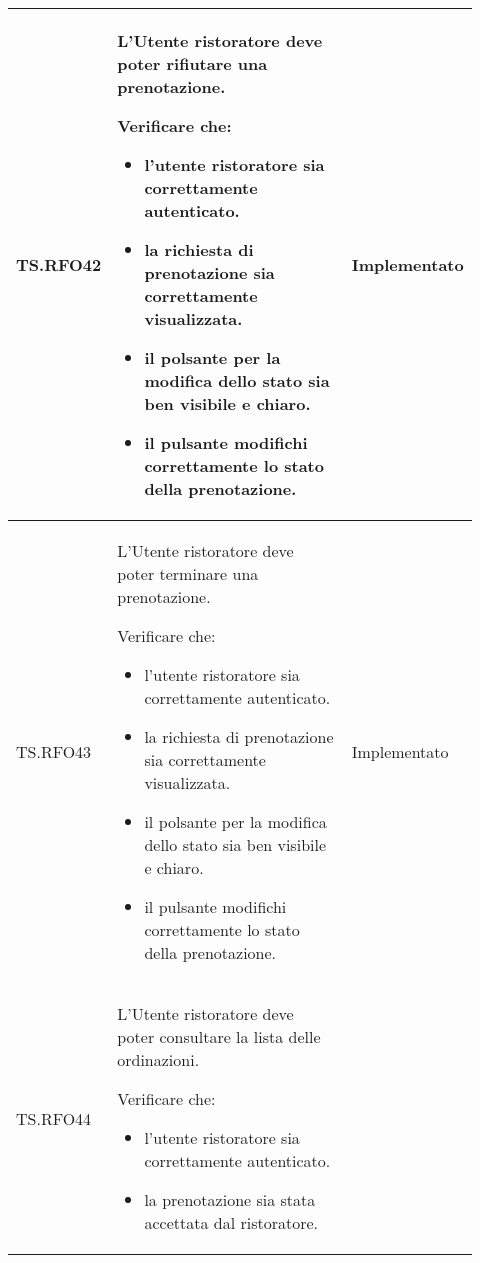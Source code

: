 \begin{longtable}{|p{0.10\linewidth}|p{0.70\linewidth}|p{0.12\linewidth}|}
	TS.RFO42                                                                                                                        &
	L'Utente ristoratore deve poter rifiutare una prenotazione. \par
	Verificare che:
	\begin{itemize}
		\item l'utente ristoratore sia correttamente autenticato.
		\item la richiesta di prenotazione sia correttamente visualizzata.
		\item il polsante per la modifica dello stato sia ben visibile e chiaro.
		\item il pulsante modifichi correttamente lo stato della prenotazione.
	\end{itemize}                                                        &
	Implementato                                                                                                                                                            \\
	\hline
	TS.RFO43                                                                                                                        &
	L'Utente ristoratore deve poter terminare una prenotazione. \par
	Verificare che:
	\begin{itemize}
		\item l'utente ristoratore sia correttamente autenticato.
		\item la richiesta di prenotazione sia correttamente visualizzata.
		\item il polsante per la modifica dello stato sia ben visibile e chiaro.
		\item il pulsante modifichi correttamente lo stato della prenotazione.
	\end{itemize}                                                        &
	Implementato                                                                                                                                                            \\
	\hline
	TS.RFO44                                                                                                                        &
	L'Utente ristoratore deve poter consultare la lista delle ordinazioni. \par
	Verificare che:
	\begin{itemize}
		\item l'utente ristoratore sia correttamente autenticato.
		\item la prenotazione sia stata accettata dal ristoratore.

\end{itemize}
\end{longtable}
